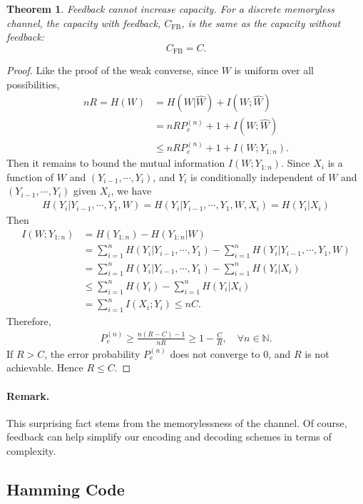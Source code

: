 \documentclass{article}
\numberwithin{equation}{section}
\newcommand{\bbN}{\mathbb{N}}
\newcommand{\wh}{\widehat}
\theoremstyle{plain}
\newtheorem{theorem}{Theorem}[section]
\theoremstyle{definition}
\begin{document}
\begin{theorem}
Feedback \textit{cannot} increase capacity. For a discrete memoryless channel, the capacity with feedback, $C_\mathrm{FB}$, is the same as the capacity without feedback:
$$C_\mathrm{FB} = C.$$
\end{theorem}
\begin{proof}
Like the proof of the weak converse, since $W$ is uniform over all possibilities,
\begin{align*}
	nR=H(W)&=H(W|\wh{W})+I(W;\wh{W})\\
	&=nRP_e^{(n)}+1+I(W;\wh{W})\tag{By Fano's inequality}\\
	&\leq nRP_e^{(n)}+1+I(W;Y_{1:n})\tag{By data processing inequality}.
\end{align*}
Then it remains to bound the mutual information $I(W;Y_{1:n})$. Since $X_i$ is a function of $W$ and $(Y_{i-1},\cdots,Y_i)$, and $Y_i$ is conditionally independent of $W$ and $(Y_{i-1},\cdots,Y_i)$ given $X_i$, we have
\begin{align*}
	H(Y_{i}|Y_{i-1},\cdots,Y_1,W)=H(Y_{i}|Y_{i-1},\cdots,Y_1,W,X_i)=H(Y_{i}|X_i)
\end{align*}
Then
\begin{align*}
	I(W;Y_{1:n})&=H(Y_{1:n})-H(Y_{1:n}|W)\\
	&=\sum_{i=1}^n H(Y_{i}|Y_{i-1},\cdots,Y_1)-\sum_{i=1}^n H(Y_{i}|Y_{i-1},\cdots,Y_1,W)\\
	&=\sum_{i=1}^n H(Y_{i}|Y_{i-1},\cdots,Y_1)-\sum_{i=1}^n H(Y_i|X_i)\\
	&\leq\sum_{i=1}^n H(Y_{i})-\sum_{i=1}^n H(Y_i|X_i)\\
	&=\sum_{i=1}^n I(X_i;Y_i)\leq nC.
\end{align*}
Therefore,
\begin{align*}
	P_e^{(n)}\geq\frac{n(R-C)-1}{nR}\geq 1-\frac{C}{R},\quad\forall n\in\bbN.
\end{align*}
If $R>C$, the error probability $P_e^{(n)}$ does not converge to $0$, and $R$ is not achievable. Hence $R\leq C$.
\end{proof}
\paragraph{Remark.} This surprising fact stems from the memorylessness of the channel. Of course, feedback can help simplify our encoding and decoding schemes in terms of complexity.

\subsection{Hamming Code}
\end{document}
